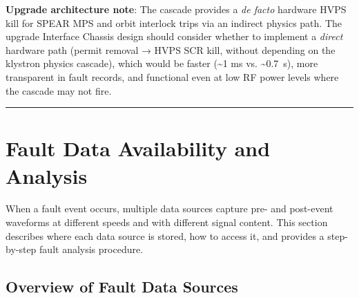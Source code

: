 \begin{keynote}
\textbf{Upgrade architecture note}: The cascade provides a \emph{de facto} hardware HVPS kill for SPEAR MPS and orbit interlock trips via an indirect physics path. The upgrade Interface Chassis design should consider whether to implement a \emph{direct} hardware path (permit removal → HVPS SCR kill, without depending on the klystron physics cascade), which would be faster (\textasciitilde1 ms vs. \textasciitilde\qty{0.7}{\second}), more transparent in fault records, and functional even at low RF power levels where the cascade may not fire.
\end{keynote}

\begin{center}\rule{0.5\linewidth}{0.5pt}\end{center}

\section{Fault Data Availability and Analysis}\label{sec:faultdata}


When a fault event occurs, multiple data sources capture pre- and post-event waveforms at different speeds and with different signal content. This section describes where each data source is stored, how to access it, and provides a step-by-step fault analysis procedure.

\subsection{Overview of Fault Data Sources}\label{sec:fd-overview}


